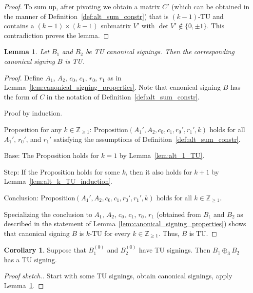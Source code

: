 \documentclass{article}
\newtheorem{lemma}{Lemma}
\theoremstyle{definition}
\newtheorem{corollary}{Corollary}
\begin{document}
\begin{proof}
    To sum up, after pivoting we obtain a matrix $C'$ (which can be obtained in the manner of Definition~\ref{def:alt_sum_constr}) that is $(k - 1)$-TU and contains a $(k - 1) \times (k - 1)$ submatrix $V'$ with $\det V' \notin \{0, \pm 1\}$. This contradiction proves the lemma.
\end{proof}

\begin{lemma}\label{lem:three_sum_canonical_signing_TU}
    Let $B_{1}$ and $B_{2}$ be TU canonical signings. Then the corresponding canonical signing $B$ is TU.
\end{lemma}

\begin{proof}
    Define $A_{1}$, $A_{2}$, $c_{0}$, $c_{1}$, $r_{0}$, $r_{1}$ as in Lemma~\ref{lem:canonical_signing_properties}. Note that canonical signing $B$ has the form of $C$ in the notation of Definition~\ref{def:alt_sum_constr}.

    Proof by induction.

    Proposition for any $k \in \mathbb{Z}_{\geq 1}$: $\mathrm{Proposition}(A_{1}', A_{2}, c_{0}, c_{1}, r_{0}', r_{1}', k)$ holds for all $A_{1}'$, $r_{0}'$, and $r_{1}'$ satisfying the assumptions of Definition~\ref{def:alt_sum_constr}.

    Base: The Proposition holds for $k = 1$ by Lemma~\ref{lem:alt_1_TU}.

    Step: If the Proposition holds for some $k$, then it also holds for $k + 1$ by Lemma~\ref{lem:alt_k_TU_induction}.

    Conclusion: $\mathrm{Proposition}(A_{1}', A_{2}, c_{0}, c_{1}, r_{0}', r_{1}', k)$ holds for all $k \in \mathbb{Z}_{\geq 1}$.

    Specializing the conclusion to $A_{1}$, $A_{2}$, $c_{0}$, $c_{1}$, $r_{0}$, $r_{1}$ (obtained from $B_{1}$ and $B_{2}$ as described in the statement of Lemma~\ref{lem:canonical_signing_properties}) shows that canonical signing $B$ is $k$-TU for every $k \in \mathbb{Z}_{\geq 1}$. Thus, $B$ is TU.
\end{proof}

\begin{corollary}
    Suppose that $B_{1}^{(0)}$ and $B_{2}^{(0)}$ have TU signings. Then $B_{1} \oplus_{3} B_{2}$ has a TU signing.
\end{corollary}

\begin{proof}[Proof sketch.]
    Start with some TU signings, obtain canonical signings, apply Lemma~\ref{lem:three_sum_canonical_signing_TU}.
\end{proof}
\end{document}
